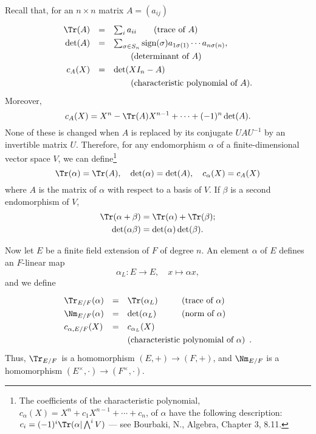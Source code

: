 \documentclass[a4paper,11pt,final,openany]{memoir}
\theoremstyle{nonumberplain}
\begin{document}
Recall that, for an $n\times n$ matrix $A=(a_{ij})$
\[
\renewcommand{\arraystretch}{1.3}
\begin{array}
[c]{rcl}%
\Tr(A) & = & \sum\nolimits_{i}a_{ii} \qquad  \text{(trace of }A\text{)}\\
\det(A) & = & \sum\nolimits_{\sigma\in S_{n}}\text{sign}(\sigma)a_{1\sigma
(1)}\cdots a_{n\sigma(n)},\quad \\
&& \qquad \text{(determinant of }A\text{)}\\
c_{A}(X) & = & \det(XI_{n}-A)\quad \\
&&\qquad \text{(characteristic polynomial of
}A\text{).}%
\end{array}
\]
Moreover,%
\[
c_{A}(X)=X^{n}-\Tr(A)X^{n-1}+\cdots+(-1)^{n}\det(A)\text{.}%
\]
None of these is changed when $A$ is replaced by its conjugate $UAU^{-1}$ by
an invertible matrix $U$. Therefore, for any endomorphism $\alpha$ of a
finite-dimensional vector space $V$, we can define\footnote{The coefficients
of the characteristic polynomial, $c_{\alpha}(X)=X^{n}+c_{1}X^{n-1}%
+\cdots+c_{n}$, of $\alpha$ have the following description: $c_{i}%
=(-1)^{i}\Tr(\alpha|\bigwedge\nolimits^{i}V)$ --- see Bourbaki, N., Algebra,
Chapter 3, 8.11.}%
\[
\Tr(\alpha)=\Tr(A),\quad\det(\alpha)=\det(A),\quad c_{\alpha}(X)=c_{A}(X)
\]
where $A$ is the matrix of $\alpha$ with respect to a basis of $V$. If $\beta$
is a second endomorphism of $V$,
\begin{align*}
\Tr(\alpha+\beta)  &  =\Tr(\alpha)+\Tr(\beta);\\
\quad\det(\alpha\beta)  &  =\det(\alpha)\det(\beta).
\end{align*}


Now let $E$ be a finite field extension of $F$ of degree $n.$ An element
$\alpha$ of $E$ defines an $F$-linear map
\[
\alpha_{L}\colon E\rightarrow E,\quad x\mapsto\alpha x,
\]
and we define%
%
%
\[
\renewcommand{\arraystretch}{1.3}
\begin{array}
[c]{llll}%
\Tr_{E/F}(\alpha) & = & \Tr(\alpha_{L}) & \text{(trace of }\alpha\text{)}\\
\Nm_{E/F}(\alpha) & = & \det(\alpha_{L})\quad\quad & \text{(norm of }%
\alpha\text{)}\\
c_{\alpha,E/F}(X) & = & c_{\alpha_{L}}(X) & \\
&&\multicolumn{2}{c}{\text{(characteristic polynomial
of }\alpha\text{)}}.
\end{array}
\]
Thus, $\Tr_{E/F}$\ is a homomorphism $(E,+)\rightarrow(F,+)$, and $\Nm_{E/F}$
is a homomorphism $(E^{\times},\cdot)\rightarrow(F^{\times},\cdot)$.
\end{document}
